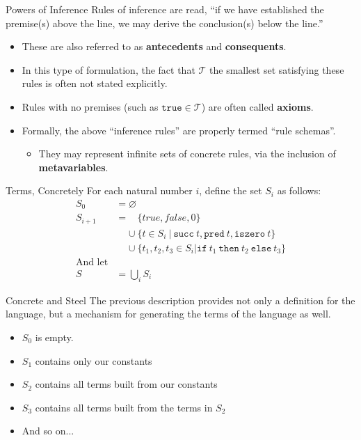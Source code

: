 \documentclass[11pt]{beamer}
\begin{document}
\begin{frame}[fragile=singleslide]{Powers of Inference}
Rules of inference are read, ``if we have established the premise(s) above the line, we may derive the conclusion(s) below the line.''  
\begin{itemize}
\item These are also referred to as \textbf{antecedents} and \textbf{consequents}.  
\item In this type of formulation, the fact that $\mathcal{T}$ the smallest set satisfying these rules is often not stated explicitly.  
\item Rules with no premises (such as $\texttt{true} \in \mathcal{T}$) are often called \textbf{axioms}.  
\item Formally, the above ``inference rules'' are properly termed ``rule schemas''.  
\begin{itemize}
\item They may represent infinite sets of concrete rules, via the inclusion of \textbf{metavariables}.
\end{itemize}
\end{itemize} 
\end{frame}

\begin{frame}[fragile=singleslide]{Terms, Concretely}
For each natural number $i$, define the set $S_i$ as follows:
\begin{align*}
S_0 &= \varnothing \\
S_{i+1} &= \:\:\:\:\{true, false, 0\} \\
& \:\:\:\:\:\cup \{t \in S_i \:|\: \texttt{succ}\: t, \texttt{pred}\: t, \texttt{iszero}\: t\} \\
& \:\:\:\:\:\cup \{t_1, t_2, t_3 \in S_i | \texttt{if}\: t_1\: \texttt{then}\: t_2 \: \texttt{else} \: t_3\} \\
\text{And let} \\
S &= \bigcup_i S_i
\end{align*}
\end{frame}

\begin{frame}[fragile=singleslide]{Concrete and Steel}
The previous description provides not only a definition for the language, but a mechanism for generating the terms of the language as well.
\begin{itemize}
\item $S_0$ is empty.
\item $S_1$ contains only our constants
\item $S_2$ contains all terms built from our constants
\item $S_3$ contains all terms built from the terms in $S_2$
\item And so on...
\end{itemize}
\end{frame}
\end{document}
